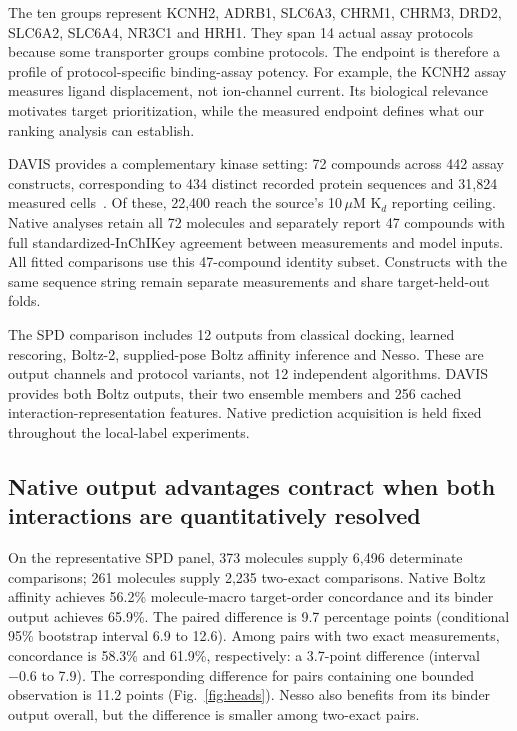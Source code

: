 \documentclass[pdflatex, sn-nature]{sn-jnl}
\begin{document}
The ten groups represent KCNH2, ADRB1, SLC6A3, CHRM1, CHRM3, DRD2, SLC6A2, SLC6A4, NR3C1 and HRH1. They span 14 actual assay protocols because some transporter groups combine protocols. The endpoint is therefore a profile of protocol-specific binding-assay potency. For example, the KCNH2 assay measures ligand displacement, not ion-channel current. Its biological relevance motivates target prioritization, while the measured endpoint defines what our ranking analysis can establish.

DAVIS provides a complementary kinase setting: 72 compounds across 442 assay constructs, corresponding to 434 distinct recorded protein sequences and 31,824 measured cells~\cite{davis2011selectivity,wu2025daviscomplete}. Of these, 22,400 reach the source's 10\,$\mu$M K$_d$ reporting ceiling. Native analyses retain all 72 molecules and separately report 47 compounds with full standardized-InChIKey agreement between measurements and model inputs. All fitted comparisons use this 47-compound identity subset. Constructs with the same sequence string remain separate measurements and share target-held-out folds.

The SPD comparison includes 12 outputs from classical docking, learned rescoring, Boltz-2, supplied-pose Boltz affinity inference and Nesso. These are output channels and protocol variants, not 12 independent algorithms. DAVIS provides both Boltz outputs, their two ensemble members and 256 cached interaction-representation features. Native prediction acquisition is held fixed throughout the local-label experiments.

\subsection{Native output advantages contract when both interactions are quantitatively resolved}
On the representative SPD panel, 373 molecules supply 6,496 determinate comparisons; 261 molecules supply 2,235 two-exact comparisons. Native Boltz affinity achieves 56.2\% molecule-macro target-order concordance and its binder output achieves 65.9\%. The paired difference is 9.7 percentage points (conditional 95\% bootstrap interval 6.9 to 12.6). Among pairs with two exact measurements, concordance is 58.3\% and 61.9\%, respectively: a 3.7-point difference (interval $-0.6$ to 7.9). The corresponding difference for pairs containing one bounded observation is 11.2 points (Fig.~\ref{fig:heads}). Nesso also benefits from its binder output overall, but the difference is smaller among two-exact pairs.
\end{document}
